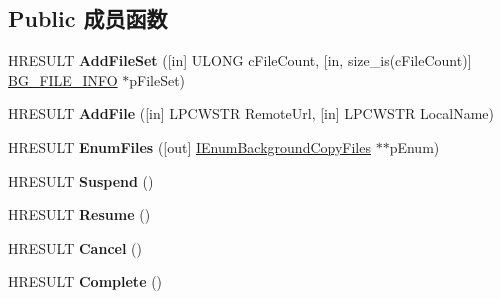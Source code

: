 \subsection*{Public 成员函数}
\begin{DoxyCompactItemize}
\item 
\mbox{\label{interface_i_background_copy_job_a32317c86ed371fcd4b4c56d6781e9bc5}} 
H\+R\+E\+S\+U\+LT {\bfseries Add\+File\+Set} (\mbox{[}in\mbox{]} U\+L\+O\+NG c\+File\+Count, \mbox{[}in, size\+\_\+is(c\+File\+Count)\mbox{]} \hyperlink{struct_i_background_copy_job_1_1___b_g___f_i_l_e___i_n_f_o}{B\+G\+\_\+\+F\+I\+L\+E\+\_\+\+I\+N\+FO} $\ast$p\+File\+Set)
\item 
\mbox{\label{interface_i_background_copy_job_a0af4f5e9973c03dcc57ae32f349a670a}} 
H\+R\+E\+S\+U\+LT {\bfseries Add\+File} (\mbox{[}in\mbox{]} L\+P\+C\+W\+S\+TR Remote\+Url, \mbox{[}in\mbox{]} L\+P\+C\+W\+S\+TR Local\+Name)
\item 
\mbox{\label{interface_i_background_copy_job_a713661711549d8ccc83d206e22956db2}} 
H\+R\+E\+S\+U\+LT {\bfseries Enum\+Files} (\mbox{[}out\mbox{]} \hyperlink{interface_i_enum_background_copy_files}{I\+Enum\+Background\+Copy\+Files} $\ast$$\ast$p\+Enum)
\item 
\mbox{\label{interface_i_background_copy_job_a74cf9be366fabe363627baa34d614b5f}} 
H\+R\+E\+S\+U\+LT {\bfseries Suspend} ()
\item 
\mbox{\label{interface_i_background_copy_job_acdc008d75ce8e003df26f961f7540d05}} 
H\+R\+E\+S\+U\+LT {\bfseries Resume} ()
\item 
\mbox{\label{interface_i_background_copy_job_a648d93db91fcb4ba22f29cd8b2275dea}} 
H\+R\+E\+S\+U\+LT {\bfseries Cancel} ()
\item 
\mbox{\label{interface_i_background_copy_job_a64567b28e7d737fc1a94cb943449dce8}} 
H\+R\+E\+S\+U\+LT {\bfseries Complete} ()
\item 
\mbox{\label{interface_i_background_copy_job_a438e4b0462c8c40f00509fdf4ff2f50f}} 
$$
\end{DoxyCompactItemize}

